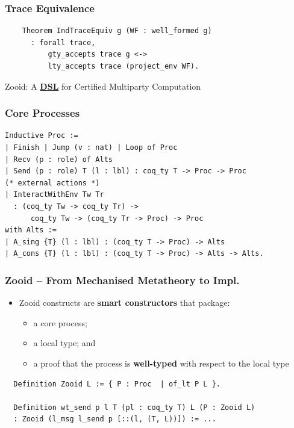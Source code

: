 \begin{frame}[fragile]
  \frametitle{Trace Equivalence}
  \begin{verbatim}
    Theorem IndTraceEquiv g (WF : well_formed g)
      : forall trace,
          gty_accepts trace g <->
          lty_accepts trace (project_env WF).
  \end{verbatim}
\end{frame}

\begin{frame}
  \vfill
  \begin{sticky}
  {\large
    Zooid:
    A
    \textbf{\underline{DSL}}
    for
    Certified
    Multiparty
    Computation\par
  }
  \end{sticky}
\end{frame}

\begin{frame}[fragile]
  \frametitle{Core Processes}
  \small
  \begin{verbatim}
Inductive Proc :=
| Finish | Jump (v : nat) | Loop of Proc
| Recv (p : role) of Alts
| Send (p : role) T (l : lbl) : coq_ty T -> Proc -> Proc
(* external actions *)
| InteractWithEnv Tw Tr
  : (coq_ty Tw -> coq_ty Tr) ->
      coq_ty Tw -> (coq_ty Tr -> Proc) -> Proc
with Alts :=
| A_sing {T} (l : lbl) : (coq_ty T -> Proc) -> Alts
| A_cons {T} (l : lbl) : (coq_ty T -> Proc) -> Alts -> Alts.
  \end{verbatim}
\end{frame}

\begin{frame}[fragile]
  \frametitle{Zooid -- From Mechanised Metatheory to Impl.}

  \begin{itemize}
    \item Zooid constructs are \textbf{smart constructors} that package:
      \begin{itemize}
        \item a core process;
        \item a local type; and
        \item a proof that the process is \textbf{well-typed} with respect to
          the local type
      \end{itemize}
  \end{itemize}
  \begin{sticky}%
  {\small%
    \vspace{-.8cm}
  \begin{verbatim}
  Definition Zooid L := { P : Proc  | of_lt P L }.

  Definition wt_send p l T (pl : coq_ty T) L (P : Zooid L)
  : Zooid (l_msg l_send p [::(l, (T, L))]) := ...
  \end{verbatim}
  }
  \end{sticky}
  
\end{frame}

